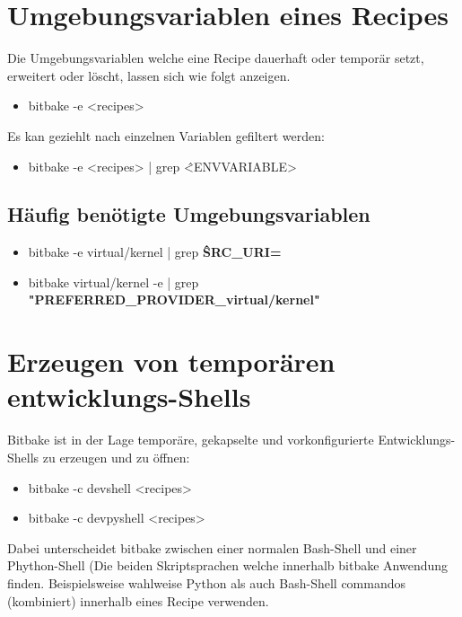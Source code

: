 \section{Umgebungsvariablen eines Recipes}%
\label{sec:umgebungsvariablen_eines_recipes}
Die Umgebungsvariablen welche eine Recipe dauerhaft oder temporär setzt,
erweitert oder löscht, lassen sich wie folgt anzeigen.
\begin{itemize}
    \item bitbake -e <recipes>
\end{itemize}

Es kan geziehlt nach einzelnen Variablen gefiltert werden:

\begin{itemize}
    \item bitbake -e <recipes> | grep \^<ENVVARIABLE>
\end{itemize}

\subsection{Häufig benötigte Umgebungsvariablen}%
\label{sub:haufig_gesucht_umgebungsvariablen}

\begin{itemize}
    \item bitbake -e virtual/kernel | grep \textbf{\^SRC_URI=}
    \item bitbake virtual/kernel -e | grep \textbf{
            "PREFERRED\_PROVIDER\_virtual/kernel"}
\end{itemize}



\section{Erzeugen von temporären entwicklungs-Shells}%
\label{sec:temporaten_entwicklungs_shells}

Bitbake ist in der Lage temporäre, gekapselte und vorkonfigurierte
Entwicklungs-Shells zu erzeugen und zu öffnen:

\begin{itemize}
    \item bitbake -c devshell <recipes>
    \item bitbake -c devpyshell <recipes>
\end{itemize}

Dabei unterscheidet bitbake zwischen einer normalen Bash-Shell und einer
Phython-Shell (Die beiden Skriptsprachen welche innerhalb bitbake Anwendung
finden. Beispielsweise wahlweise Python als auch Bash-Shell commandos
(kombiniert) innerhalb eines Recipe verwenden.

